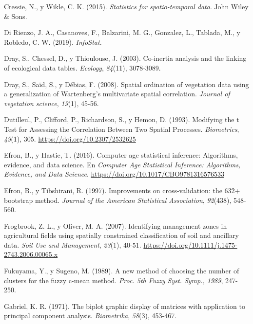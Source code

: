 \documentclass[11pt,b5paper,]{krantz}
\begin{document}
\leavevmode\hypertarget{ref-Cressie_Wikle_2015}{}%
Cressie, N., y Wikle, C. K. (2015). \emph{Statistics for spatio-temporal data}. John Wiley \& Sons.

\leavevmode\hypertarget{ref-Di_Rienzo_Casanoves_Balzarini_Gonzalez_Tablada_Robledo_2019}{}%
Di Rienzo, J. A., Casanoves, F., Balzarini, M. G., Gonzalez, L., Tablada, M., y Robledo, C. W. (2019). \emph{InfoStat}.

\leavevmode\hypertarget{ref-Dray_Chessel_Thioulouse_2003}{}%
Dray, S., Chessel, D., y Thioulouse, J. (2003). Co‐inertia analysis and the linking of ecological data tables. \emph{Ecology}, \emph{84}(11), 3078-3089.

\leavevmode\hypertarget{ref-Dray_Sauxefd_Duxe9bias_2008}{}%
Dray, S., Saïd, S., y Débias, F. (2008). Spatial ordination of vegetation data using a generalization of Wartenberg's multivariate spatial correlation. \emph{Journal of vegetation science}, \emph{19}(1), 45-56.

\leavevmode\hypertarget{ref-Dutilleul_Clifford_Richardson_Hemon_1993}{}%
Dutilleul, P., Clifford, P., Richardson, S., y Hemon, D. (1993). Modifying the t Test for Assessing the Correlation Between Two Spatial Processes. \emph{Biometrics}, \emph{49}(1), 305. \url{https://doi.org/10.2307/2532625}

\leavevmode\hypertarget{ref-Efron_Hastie_2016}{}%
Efron, B., y Hastie, T. (2016). Computer age statistical inference: Algorithms, evidence, and data science. En \emph{Computer Age Statistical Inference: Algorithms, Evidence, and Data Science}. \url{https://doi.org/10.1017/CBO9781316576533}

\leavevmode\hypertarget{ref-Efron_Tibshirani_1997}{}%
Efron, B., y Tibshirani, R. (1997). Improvements on cross-validation: the 632+ bootstrap method. \emph{Journal of the American Statistical Association}, \emph{92}(438), 548-560.

\leavevmode\hypertarget{ref-Frogbrook_Oliver_2007}{}%
Frogbrook, Z. L., y Oliver, M. A. (2007). Identifying management zones in agricultural fields using spatially constrained classification of soil and ancillary data. \emph{Soil Use and Management}, \emph{23}(1), 40-51. \url{https://doi.org/10.1111/j.1475-2743.2006.00065.x}

\leavevmode\hypertarget{ref-Fukuyama_Sugeno_1989}{}%
Fukuyama, Y., y Sugeno, M. (1989). A new method of choosing the number of clusters for the fuzzy c-mean method. \emph{Proc. 5th Fuzzy Syst. Symp., 1989}, 247-250.

\leavevmode\hypertarget{ref-Gabriel_1971}{}%
Gabriel, K. R. (1971). The biplot graphic display of matrices with application to principal component analysis. \emph{Biometrika}, \emph{58}(3), 453-467.
\end{document}
